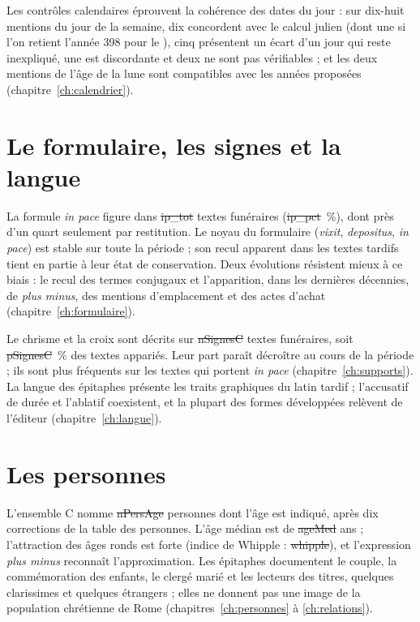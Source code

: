 Les contrôles calendaires éprouvent la cohérence des dates du jour : sur dix-huit mentions du jour de la semaine, dix concordent avec le calcul julien (dont une si l’on retient l’année 398 pour le ), cinq présentent un écart d’un jour qui reste inexpliqué, une est discordante et deux ne sont pas vérifiables ; et les deux mentions de l’âge de la lune sont compatibles avec les années proposées (chapitre~\ref{ch:calendrier}).

\section{Le formulaire, les signes et la langue}

La formule \emph{in pace} figure dans \st{ip_tot} textes funéraires (\st{ip_pct}~\%), dont près d’un quart seulement par restitution. Le noyau du formulaire (\emph{vixit}, \emph{depositus}, \emph{in pace}) est stable sur toute la période ; son recul apparent dans les textes tardifs tient en partie à leur état de conservation. Deux évolutions résistent mieux à ce biais : le recul des termes conjugaux et l’apparition, dans les dernières décennies, de \emph{plus minus}, des mentions d’emplacement et des actes d’achat (chapitre~\ref{ch:formulaire}).

Le chrisme et la croix sont décrits sur \st{nSignesC} textes funéraires, soit \st{pSignesC}~\% des textes appariés. Leur part paraît décroître au cours de la période ; ils sont plus fréquents sur les textes qui portent \emph{in pace} (chapitre~\ref{ch:supports}). La langue des épitaphes présente les traits graphiques du latin tardif ; l’accusatif de durée et l’ablatif coexistent, et la plupart des formes développées relèvent de l’éditeur (chapitre~\ref{ch:langue}).

\section{Les personnes}

L’ensemble C nomme \st{nPersAge} personnes dont l’âge est indiqué, après dix corrections de la table des personnes. L’âge médian est de \st{ageMed} ans ; l’attraction des âges ronds est forte (indice de Whipple : \st{whipple}), et l’expression \emph{plus minus} reconnaît l’approximation. Les épitaphes documentent le couple, la commémoration des enfants, le clergé marié et les lecteurs des titres, quelques clarissimes et quelques étrangers ; elles ne donnent pas une image de la population chrétienne de Rome (chapitres~\ref{ch:personnes} à \ref{ch:relations}).

